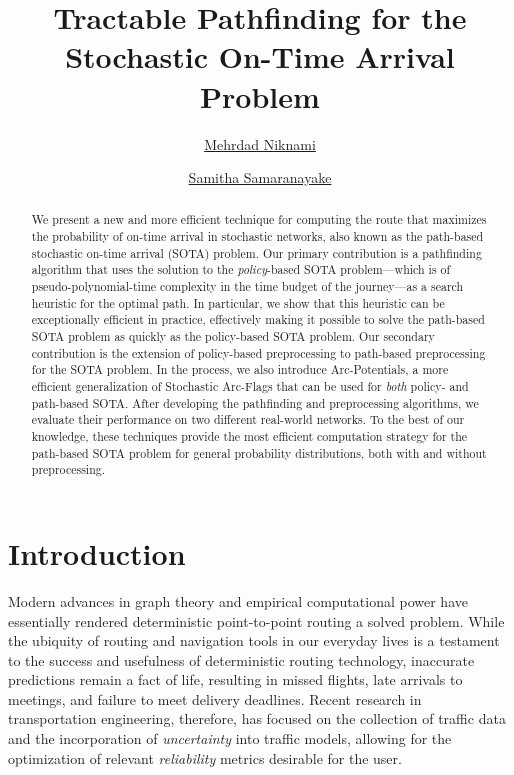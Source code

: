 \documentclass[oribibl]{llncs}
\title{Tractable Pathfinding for the\texorpdfstring\\.Stochastic On-Time Arrival Problem}
\date{}
\author
{
	\href{mailto:mniknami@berkeley.edu}{Mehrdad Niknami}\inst{1} \and
	\href{mailto:samitha@cornell.edu}{Samitha Samaranayake}\inst{2}
}
\institute
{
	Electrical Engineering and Computer Science, UC Berkeley \and
	School of Civil and Environmental Engineering, Cornell University
}
\begin{document}
	\maketitle

	\begin{abstract}
		We present a new and more efficient technique for computing the route that maximizes the probability of
		on-time arrival in stochastic networks, also known as the path-based stochastic on-time arrival
		(SOTA) problem.
		Our primary contribution is a pathfinding algorithm that uses the solution to the \textit{policy}-based
		SOTA problem---which is of pseudo-polynomial-time complexity in the time budget of the journey---as
		a search heuristic for the optimal path.
		In particular, we show that this heuristic can be exceptionally efficient in practice, effectively
		making it possible to solve the path-based SOTA problem as quickly as the policy-based SOTA problem.
		Our secondary contribution is the extension of policy-based preprocessing to path-based preprocessing
		for the SOTA problem. In the process, we also introduce Arc-Potentials, a more efficient generalization
		of Stochastic Arc-Flags that can be used for \textit{both} policy- and path-based SOTA.
		After developing the pathfinding and preprocessing algorithms, we evaluate their performance
		on two different real-world networks.
		To the best of our knowledge, these techniques provide the most efficient computation strategy
		for the path-based SOTA problem for general probability distributions,
		both with and without preprocessing.
	\end{abstract}

	\section{Introduction}
		Modern advances in graph theory and empirical computational power
		have essentially rendered deterministic point-to-point routing a solved problem.
		While the ubiquity of routing and navigation tools in our everyday lives
		is a testament to the success and usefulness of deterministic routing technology,
		inaccurate predictions remain a fact of life, resulting in missed flights,
		late arrivals to meetings, and failure to meet delivery deadlines.
		Recent research in transportation engineering, therefore, has focused on
		the collection of traffic data and the incorporation of \textit{uncertainty} into traffic models,
		allowing for the optimization of relevant \textit{reliability} metrics desirable for the user.
\end{document}
